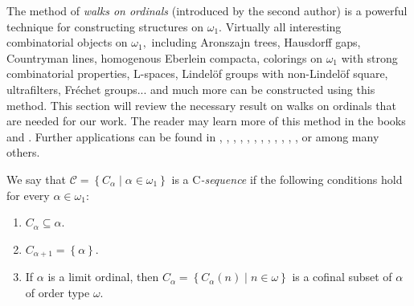 \documentclass{article}
\begin{document}
The method of \emph{walks on ordinals} (introduced by the second author) is a
powerful technique for constructing structures on $\omega_{1}.$ Virtually all
interesting combinatorial objects on $\omega_{1},$ including Aronszajn trees,
Hausdorff gaps, Countryman lines, homogenous Eberlein compacta, colorings on
$\omega_{1}$ with strong combinatorial properties, \textsf{L}-spaces,
Lindel\"{o}f groups with non-Lindel\"{o}f square, ultrafilters, Fr\'{e}chet
groups... and much more can be constructed using this method. This section
will review the necessary result on walks on ordinals that are needed for our
work. The reader may learn more of this method in the books \cite{Walks} and
\cite{TopicsinSetTheory}. Further applications can be found in
\cite{WalksandselectiveUltrafilters}, \cite{PIDandTukey},
\cite{KomjathInaccesible}, \cite{Lspace}, \cite{LSpacewithseparablesquare},
\cite{HrusakEstrellitas}, \cite{LindeloffGroup}, \cite{LVectorSpaces},
\cite{FirstOmegaAlephs}, \cite{GroupsfromWalks},
\cite{RectangularSquareBracket}, \cite{ComplicatedColoringsRevisited},
\cite{CombinatorialPropertyofpfunctions} or \cite{KnasterandFriendsI} among
many others.

\qquad\qquad\qquad\qquad

We say that $\mathcal{C}=\left\{  C_{\alpha}\mid\alpha\in\omega_{1}\right\}  $
is a \textsf{C}\emph{-sequence }if the following conditions hold for every
$\alpha\in\omega_{1}:$

\begin{enumerate}
\item $C_{\alpha}\subseteq\alpha.$

\item $C_{\alpha+1}=\left\{  \alpha\right\}  .$

\item If $\alpha$ is a limit ordinal, then $C_{\alpha}=\left\{  C_{\alpha
}\left(  n\right)  \mid n\in\omega\right\}  $ is a cofinal subset of $\alpha$
of order type $\omega.$
\end{enumerate}

\qquad\qquad\ \qquad\ \qquad\ \ \ 
\end{document}
